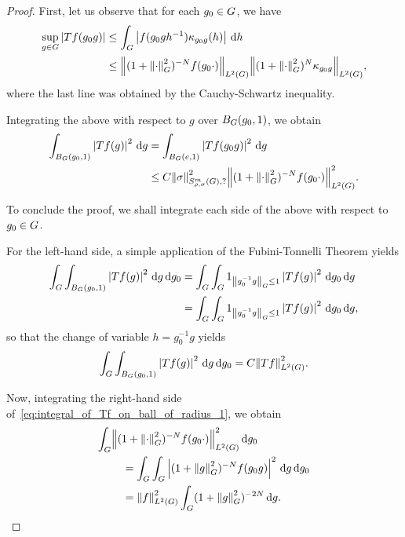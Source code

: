 \begin{proof}
    First, let us observe that for each $g_0 \in \Group$, we have
    \begin{align*}
        \sup_{g \in \Group} \abs {T f(g_0 g)}
        &\leq \int_\Group \abs{f(g_0 g h^{-1}) \kappa_{g_0 g}(h)} \dd h\\
        &\leq \norm [\Lebesgue 2 \Group] {(1 + \norm [\Group] \dummy^2)^{-N} f(g_0 \dummy)} \norm [\Lebesgue 2 \Group] {(1 + \norm [\Group] \dummy^2)^N \kappa_{g_0 g}},
    \end{align*}
    where the last line was obtained by the Cauchy-Schwartz inequality.

    Integrating the above with respect to $g$ over $\Ball [\Group] {g_0} 1$,
    we obtain
    \begin{align}
        \int_{\Ball [\Group] {g_0} 1} \abs {T f(g)}^2 \dd g
        &= \int_{\Ball [\Group] e 1} \abs {T f(g_0 g)}^2 \dd g\notag\\
        &\leq C \SymbolSemiNorm m {\rho, \sigma} ? \sigma^2
        \norm [\Lebesgue 2 \Group] {(1 + \norm [\Group] \dummy^2)^{-N} f(g_0 \dummy)}^2.
        \label{eq:integral_of_Tf_on_ball_of_radius_1}
    \end{align}

    To conclude the proof,
    we shall integrate each side of the above with respect to $g_0 \in \Group$.

    For the left-hand side,
    a simple application of the Fubini-Tonnelli Theorem yields
    \begin{align*}
        \int_\Group \int_{\Ball [\Group] {g_0} 1} \abs {T f(g)}^2 \dd g \dd g_0
        &= \int_\Group \int_\Group 1_{\norm [\Group] {g_0^{-1} g} \leq 1} \abs {T f(g)}^2 \dd g_0 \dd g\\
        &= \int_\Group \int_\Group 1_{\norm [\Group] {g_0^{-1} g} \leq 1} \abs {T f(g)}^2 \dd g_0 \dd g,
    \end{align*}
    so that the change of variable $h = g_0^{-1} g$ yields
    \begin{align}
        \int_\Group \int_{\Ball [\Group] {g_0} 1} \abs {T f(g)}^2 \dd g \dd g_0
        = C \norm [\Lebesgue 2 \Group] {T f}^2.
        \label{eq:left_hand_side_of_ball_integral_for_L2_boundedness}
    \end{align}

    Now, integrating the right-hand side of~\eqref{eq:integral_of_Tf_on_ball_of_radius_1},
    we obtain
    \begin{align*}
        \int_\Group &\norm [\Lebesgue 2 \Group] {(1 + \norm [\Group] \dummy^2)^{-N} f(g_0 \dummy)}^2 \dd g_0\\
        &\quad = \int_\Group \int_\Group \abs{(1 + \norm [\Group] g^2)^{-N} f(g_0 g)}^2 \dd g \dd g_0\\
        &\quad = \norm [\Lebesgue 2 \Group] f^2 \int_\Group (1 + \norm [\Group] g^2)^{-2 N} \dd g.
    \end{align*}


\end{proof}
